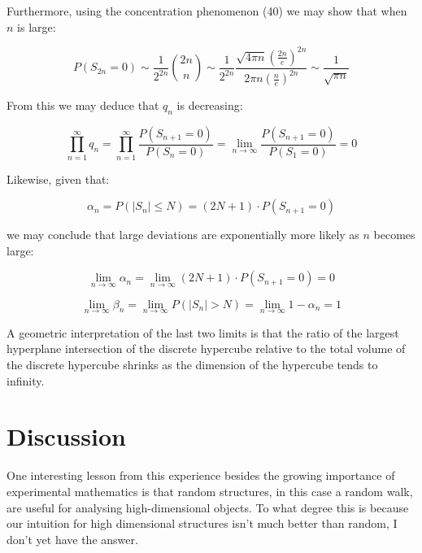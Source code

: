 \documentclass{article}
\begin{document}
Furthermore, using the concentration phenomenon (40) we may show that when $n$ is large:

\begin{equation}
P(S_{2n}=0) \sim \frac{1}{2^{2n}} {2n \choose n} \sim \frac{1}{2^{2n}} \frac{\sqrt{4 \pi n} (\frac{2n}{e})^{2n}}{2 \pi n (\frac{n}{e})^{2n}} \sim \frac{1}{\sqrt{\pi n}}
\end{equation}

From this we may deduce that $q_n$ is decreasing:


\begin{equation}
\prod_{n=1}^\infty q_n = \prod_{n=1}^\infty \frac{P(S_{n+1}=0)}{P(S_n=0)} = \lim_{n \to \infty} \frac{P(S_{n+1}=0)}{P(S_1=0)} = 0
\end{equation}

Likewise, given that:

\begin{equation}
\alpha_n = P(\lvert S_n \rvert \leq N) = (2N+1) \cdot P(S_{n+1}=0)
\end{equation}

we may conclude that large deviations are exponentially more likely as $n$ becomes large:

\begin{equation}
\lim_{n \to \infty} \alpha_n = \lim_{n \to \infty} (2N+1) \cdot P(S_{n+1}=0) = 0
\end{equation}

\begin{equation}
\lim_{n \to \infty} \beta_n = \lim_{n \to \infty} P(\lvert S_n \rvert > N) = \lim_{n \to \infty} 1 - \alpha_n = 1
\end{equation}

A geometric interpretation of the last two limits is that the ratio of the largest hyperplane intersection of the discrete hypercube relative to the total volume of the discrete hypercube shrinks as the dimension of the hypercube tends to infinity.

\section{Discussion}

One interesting lesson from this experience besides the growing importance of 
experimental mathematics is that random structures, in this case a random walk, 
are useful for analysing high-dimensional objects. To what degree this is because
our intuition for high dimensional structures isn't much better than random, I don't yet have the answer. 
\end{document}

